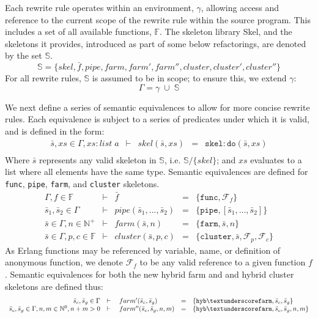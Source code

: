 \documentclass[final]{jfp1}
\makeatletter
\newcommand{\func}[0]{\texttt{func}\xspace}
\newcommand{\pipe}[0]{\texttt{pipe}\xspace}
\newcommand{\farm}[0]{\texttt{farm}\xspace}
\newcommand{\cluster}[0]{\texttt{cluster}\xspace}
\newcommand{\f}[0]{\bar{f}}
\newcommand{\s}[0]{\bar{s}}
\newcommand{\blf}[0]{\mathbb{F}}
\newcommand{\bn}[0]{\mathbb{N}}
\newcommand{\bnp}[0]{\bn^{+}}
\newcommand{\bnz}[0]{\bn^{0}}
\newcommand{\type}[3]{#1: #2\; #3}
\newcommand{\ing}[1]{#1 \in{} \Gamma}
\newcommand{\seq}[3]{#1 & \vdash{} & #2 & = & #3}
\newcommand{\ie}[0]{i.e.\@\xspace}
\makeatother
\begin{document}
Each rewrite rule operates within an environment, $\gamma$, allowing access and
reference to the current scope of the rewrite rule within the source program.
This includes a set of all available functions, $\mathbb{F}$. The skeleton
library Skel, and the skeletons it provides, introduced as part of some below
refactorings, are denoted by the set $\mathbb{S}$.
% 
\[
  \mathbb{S} = \{skel, \bar{f}, pipe, farm, farm', farm'', cluster, cluster',
  cluster''\} 
\]
% 
\noindent
For all rewrite rules, $\mathbb{S}$ is assumed to be in scope; to
ensure this, we extend $\gamma$:
% 
\[
  \Gamma = \gamma\; \cup\; \mathbb{S}
\]
% 

\noindent
We next define a series of semantic equivalences to allow for more concise
rewrite rules. Each equivalence is subject to a series of predicates under which
it is valid, and is defined in the form:
% 
\[
  \begin{array}{rclcl}
    \seq{\ing{\s, xs}, \type{xs}{list}{a}}
    {skel(\s, xs)}{\mathtt{skel:do}(\s, xs)} \\
  \end{array}
\]
%  
Where $\bar{s}$ represents any valid skeleton in $\mathbb{S}$, \ie{}
$\mathbb{S}/\{skel\}$; and $xs$ evaluates to a list where all elements have the
same type.
Semantic equivalences are defined for \func, \pipe, \farm, and \cluster
skeletons.
% 
\[
  \begin{array}{rclcl}
    \seq{\Gamma, f \in \blf}{\f}{\{\mathtt{func}, \mathcal{F}_f\}} \\
    \seq{\ing{\s_1, \s_2}}{pipe(\s_1,\dots,\s_2)}{\{\mathtt{pipe}, [\s_1,\dots,\s_2]\}} \\
    \seq{\ing{\s}, n \in \bnp}{farm(\s, n)}{\{\mathtt{farm}, \s, n\}} \\
    \seq{\ing{\s}, p, c \in \blf}{cluster(\s, p, c)}{\{\mathtt{cluster}, \s,
    \mathcal{F}_p, \mathcal{F}_c\}}
  \end{array}
\]
% 
As Erlang functions may be referenced by variable, name, or definition of
anonymous function, we denote $\mathcal{F}_f$ to be any valid reference to a
given function $f$.
% 
Semantic equivalences for both the new hybrid farm and and hybrid cluster skeletons are defined thus:
% 
\[
  \begin{array}{rclcl}
  \seq{\ing{\s_c,\s_g}}{farm'(\s_c, \s_g)}{\{\mathtt{hyb\textunderscore farm},
      \s_c, \s_g\}} \\
  \seq{\ing{\s_c, \s_g}, n,m \in \bnz, n + m > 0}
  {farm''(\s_c,\s_g,n,m)}{\{\mathtt{hyb\textunderscore farm}, \s_c, \s_g, n,
    m\}} \\
  \end{array}
\]
\end{document}
